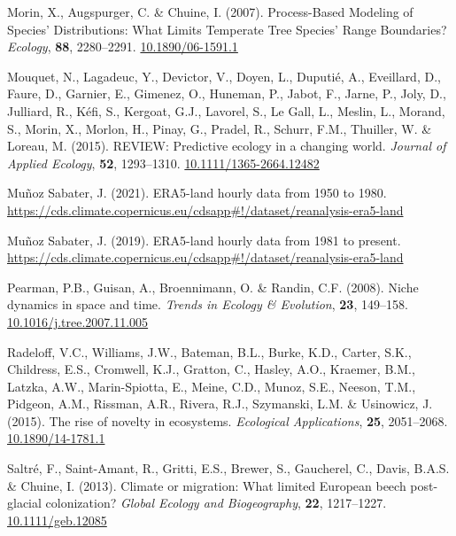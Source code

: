 \documentclass[11pt,]{article}
\newlength{\cslhangindent}
\newenvironment{CSLReferences}[2] %
 {%
  \setlength{\parindent}{0pt}
  \ifodd #1 \everypar{\setlength{\hangindent}{\cslhangindent}}\ignorespaces\fi
  \ifnum #2 > 0
  \setlength{\parskip}{#2\baselineskip}
  \fi
 }%
 {}
\begin{document}
\begin{CSLReferences}{1}{0}
\leavevmode{}%
Morin, X., Augspurger, C. \& Chuine, I. (2007). Process-{Based}
{Modeling} of {Species}' {Distributions}: {What} {Limits} {Temperate}
{Tree} {Species}' {Range} {Boundaries}? \emph{Ecology}, \textbf{88},
2280--2291. \href{https://doi.org/10.1890/06-1591.1}{10.1890/06-1591.1}

\leavevmode{}%
Mouquet, N., Lagadeuc, Y., Devictor, V., Doyen, L., Duputié, A.,
Eveillard, D., Faure, D., Garnier, E., Gimenez, O., Huneman, P., Jabot,
F., Jarne, P., Joly, D., Julliard, R., Kéfi, S., Kergoat, G.J., Lavorel,
S., Le Gall, L., Meslin, L., Morand, S., Morin, X., Morlon, H., Pinay,
G., Pradel, R., Schurr, F.M., Thuiller, W. \& Loreau, M. (2015).
{REVIEW}: {Predictive} ecology in a changing world. \emph{Journal of
Applied Ecology}, \textbf{52}, 1293--1310.
\href{https://doi.org/10.1111/1365-2664.12482}{10.1111/1365-2664.12482}

\leavevmode{}%
Muñoz Sabater, J. (2021). ERA5-land hourly data from 1950 to 1980.
\url{https://cds.climate.copernicus.eu/cdsapp\#!/dataset/reanalysis-era5-land}

\leavevmode{}%
Muñoz Sabater, J. (2019). ERA5-land hourly data from 1981 to present.
\url{https://cds.climate.copernicus.eu/cdsapp\#!/dataset/reanalysis-era5-land}

\leavevmode{}%
Pearman, P.B., Guisan, A., Broennimann, O. \& Randin, C.F. (2008). Niche
dynamics in space and time. \emph{Trends in Ecology \& Evolution},
\textbf{23}, 149--158.
\href{https://doi.org/10.1016/j.tree.2007.11.005}{10.1016/j.tree.2007.11.005}

\leavevmode{}%
Radeloff, V.C., Williams, J.W., Bateman, B.L., Burke, K.D., Carter,
S.K., Childress, E.S., Cromwell, K.J., Gratton, C., Hasley, A.O.,
Kraemer, B.M., Latzka, A.W., Marin-Spiotta, E., Meine, C.D., Munoz,
S.E., Neeson, T.M., Pidgeon, A.M., Rissman, A.R., Rivera, R.J.,
Szymanski, L.M. \& Usinowicz, J. (2015). The rise of novelty in
ecosystems. \emph{Ecological Applications}, \textbf{25}, 2051--2068.
\href{https://doi.org/10.1890/14-1781.1}{10.1890/14-1781.1}

\leavevmode{}%
Saltré, F., Saint-Amant, R., Gritti, E.S., Brewer, S., Gaucherel, C.,
Davis, B.A.S. \& Chuine, I. (2013). Climate or migration: What limited
{European} beech post-glacial colonization? \emph{Global Ecology and
Biogeography}, \textbf{22}, 1217--1227.
\href{https://doi.org/10.1111/geb.12085}{10.1111/geb.12085}


\end{CSLReferences}
\end{document}
